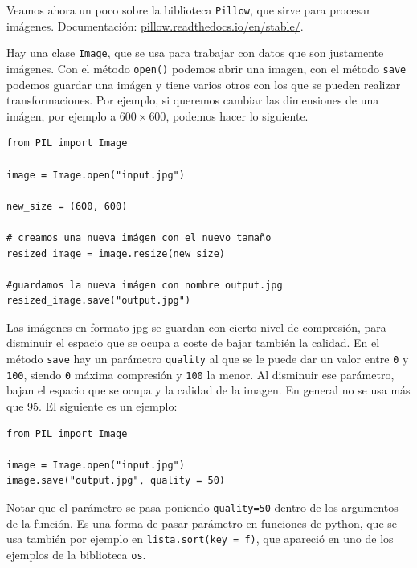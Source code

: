\documentclass[a4paper, 12pt]{report}
\theoremstyle{definition}
\begin{document}
\vspace{1em}
Veamos ahora un poco sobre la biblioteca {\tt Pillow}, que sirve para procesar imágenes. Documentación: \href{https://pillow.readthedocs.io/en/stable/}{pillow.readthedocs.io/en/stable/}.

Hay una clase {\tt Image}, que se usa para trabajar con datos que son justamente imágenes. Con el método {\tt open()} podemos abrir una imagen, con el método {\tt save} podemos guardar una imágen y tiene varios otros con los que se pueden realizar transformaciones. Por ejemplo, si queremos cambiar las dimensiones de una imágen, por ejemplo a $600\times 600$, podemos hacer lo siguiente.
\begin{verbatim}
from PIL import Image

image = Image.open("input.jpg")

new_size = (600, 600)

# creamos una nueva imágen con el nuevo tamaño
resized_image = image.resize(new_size)

#guardamos la nueva imágen con nombre output.jpg
resized_image.save("output.jpg")
\end{verbatim}

Las imágenes en formato jpg se guardan con cierto nivel de compresión, para disminuir el espacio que se ocupa a coste de bajar también la calidad. En el método {\tt save} hay un parámetro {\tt quality} al que se le puede dar un valor entre {\tt 0} y {\tt 100}, siendo {\tt 0} máxima compresión y {\tt 100} la menor. Al disminuir ese parámetro, bajan el espacio que se ocupa y la calidad de la imagen. En general no se usa más que 95. El siguiente es un ejemplo:
\begin{verbatim}
from PIL import Image

image = Image.open("input.jpg")
image.save("output.jpg", quality = 50)
\end{verbatim}
Notar que el parámetro se pasa poniendo {\tt quality=50} dentro de los argumentos de la función. Es una forma de pasar parámetro en funciones de python, que se usa también por ejemplo en {\tt lista.sort(key = f)}, que apareció en uno de los ejemplos de la biblioteca {\tt os}.
\end{document}
